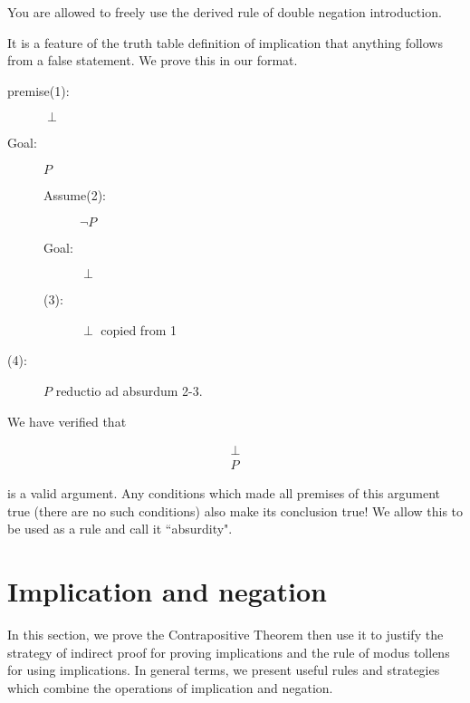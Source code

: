 \documentclass[12pt]{article}
\begin{document}
You are allowed to freely use the derived rule of double negation introduction.

It is a feature of the truth table definition of implication that anything follows from a false statement.  We prove this in our format.

\begin{description}

\item[premise(1):]  $\perp$

\item[Goal:]  $P$

\begin{description}

\item[Assume(2):]  $\neg P$

\item[Goal:]  $\perp$

\item[(3):]  $\perp$  copied from 1

\end{description}

\item[(4):]  $P$ reductio ad absurdum 2-3.


\end{description}

We have verified that

$$\begin{array}{c}

\perp \\ \hline

P

\end{array}$$

is a valid argument.  Any conditions which made all premises of this argument true (there are no such conditions) also make its conclusion true!  We allow this to be used
as a rule and call it ``absurdity".


\newpage

\section{Implication and negation}

In this section, we prove the Contrapositive Theorem then use it to justify the strategy of indirect proof for proving implications and the rule of modus tollens for using implications.  In general terms, we present useful rules and strategies which combine the operations of implication and negation.
\end{document}
